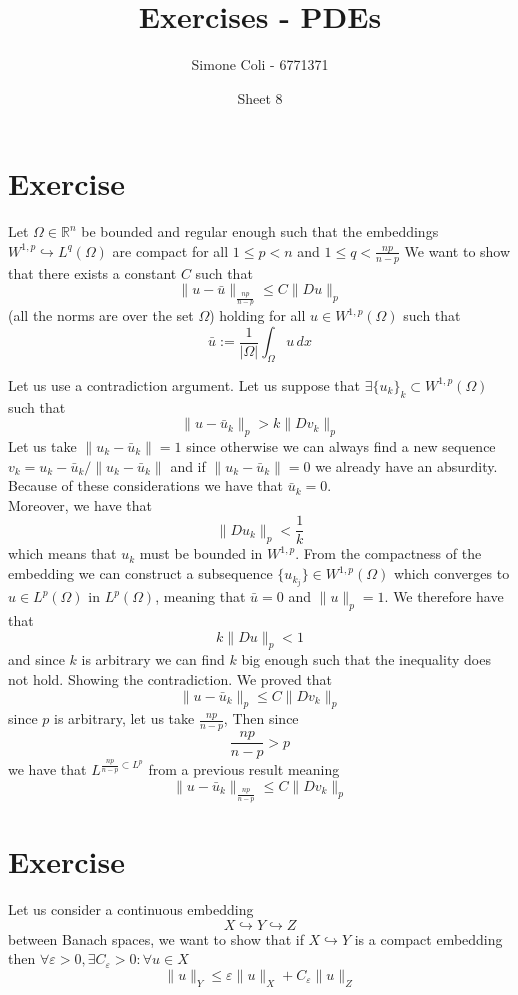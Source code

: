 \documentclass{article}
\title{Exercises - PDEs}
\author{Simone Coli - 6771371}
\date{Sheet 8}
\newcommand{\R}{\mathbb{R}}
\begin{document}
\maketitle

\section{Exercise}

Let $\Omega \in \R^n$ be bounded and regular enough such that the embeddings $W^{1,p} \hookrightarrow L^q (\Omega)$ are compact for all $1 \leq p < n$ and $1 \leq q < \frac{np}{n-p}$ We want to show that there exists a constant $C$ such that 
\[
    \| u- \bar u \|_{\frac{np}{n-p}} \leq C \| Du \|_p
\]
(all the norms are over the set $\Omega$) holding for all $u \in W^{1,p}(\Omega)$ such that
\[
    \bar u := \frac{1}{|\Omega|}\int_\Omega u\, dx
\]

Let us use a contradiction argument. Let us suppose that $\exists \{u_k \}_k \subset W^{1,p}(\Omega)$ such that 
\[
    \| u - \bar u_k\|_p > k \| D v_k \|_p
\]
Let us take $\| u_k - \bar u_k \| = 1$ since otherwise we can always find a new sequence $v_k = u_k - \bar u_k / \| u_k - \bar u_k \|$ and if $\| u_k - \bar u_k \| = 0$ we already have an absurdity. Because of these considerations we have that $\bar u_k = 0$.\\
Moreover, we have that 
\[
    \| D u_k \|_p < \frac{1}{k}
\]
which means that $u_k$ must be bounded in $W^{1,p}$. From the compactness of the embedding we can construct a subsequence $\{u_{k_j} \} \in W^{1,p} (\Omega)$ which converges to $u \in L^p(\Omega)$ in $L^p(\Omega)$, meaning that $\bar u = 0$ and $\| u \|_p = 1$. We therefore have that
\[
    k \| Du \|_p < 1
\]
and since $k$ is arbitrary we can find $k $ big enough such that the inequality does not hold. Showing the contradiction. We proved that
\[
    \| u - \bar u_k\|_p \leq C \| D v_k \|_p
\]
since $p$ is arbitrary, let us take $\frac{np}{n-p}$, Then since
\[
    \frac{np}{n-p}>p
\]
we have that $L^{\frac{np}{n-p} \subset L^p}$ from a previous result meaning
\[
    \| u - \bar u_k\|_{\frac{np}{n-p}} \leq C \| D v_k \|_p
\]
\section{Exercise}

Let us consider a continuous embedding
\[
    X \hookrightarrow Y \hookrightarrow  Z
\]
between Banach spaces, we want to show that if $X \hookrightarrow Y$ is a compact embedding then $\forall \varepsilon > 0, \exists C_\varepsilon > 0 : \forall u \in X$
\[
    \| u \|_Y \leq \varepsilon \| u \|_X + C_\varepsilon \| u \|_Z
\]
\end{document}
